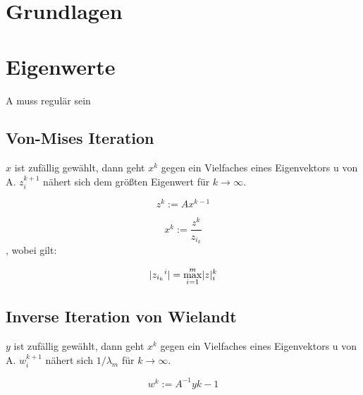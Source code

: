 \documentclass[11pt]{scrartcl}
\DeclarePairedDelimiter\abs{\lvert}{\rvert}%
\begin{document}
\section{Grundlagen}

\pagebreak

\section{Eigenwerte}

A muss regulär sein

\subsection{Von-Mises Iteration}

$x$ ist zufällig gewählt, dann geht $x^k$ gegen ein Vielfaches eines Eigenvektors u von A.
$z_i^{k+1}$ nähert sich dem größten Eigenwert für $k\rightarrow \infty$.

\begin{equation}
z^k:=Ax^{k-1}
\end{equation}

\begin{equation}
x^k:=\frac{z^k}{z_{i_k}}
\end{equation}
, wobei gilt:

\begin{equation}
\abs{{z_{i_k}}^i}=\max_{i=1}^m\abs z_i^k
\end{equation}

\subsection{Inverse Iteration von Wielandt}

$y$ ist zufällig gewählt, dann geht $x^k$ gegen ein Vielfaches eines Eigenvektors u von A.
$w_i^{k+1}$ nähert sich $1/\lambda_m$ für $k\rightarrow \infty$.

\begin{equation}
w^k:=A^{-1}y{k-1}
\end{equation}
\end{document}
